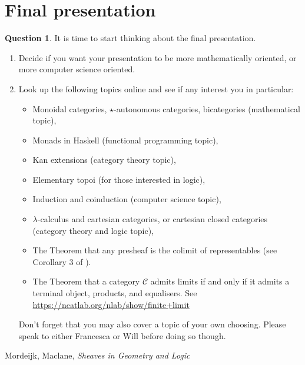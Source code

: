 \documentclass[12pt]{article}
\theoremstyle{plain}
\theoremstyle{definition}
\newtheorem{question}[thm]{Question}
\newcommand{\scr}[1]{\mathscr{#1}}
\begin{document}
	\section{Final presentation}
	\begin{question} It is time to start thinking about the final presentation.
		\begin{enumerate}
			\item Decide if you want your presentation to be more mathematically oriented, or more computer science oriented.
			\item Look up the following topics online and see if any interest you in particular:
			\begin{itemize}
				\item Monoidal categories, $\star$-autonomous categories, bicategories (mathematical topic),
				\item Monads in Haskell (functional programming topic),
				\item Kan extensions (category theory topic),
				\item Elementary topoi (for those interested in logic),
				\item Induction and coinduction (computer science topic),
				\item $\lambda$-calculus and cartesian categories, or cartesian closed categories (category theory and logic topic),
				\item The Theorem that any presheaf is the colimit of representables (see Corollary 3 of \cite[Page 42]{MM}).
				\item The Theorem that a category $\scr{C}$ admits limits if and only if it admits a terminal object, products, and equalisers. See \url{https://ncatlab.org/nlab/show/finite+limit}
				\end{itemize}
			Don't forget that you may also cover a topic of your own choosing. Please speak to either Francesca or Will before doing so though.
			\end{enumerate}
		\end{question}
	
	\begin{thebibliography}{9}
		 Mordeijk, Maclane, \emph{Sheaves in Geometry and Logic}
		\end{thebibliography}
	
	
	
	
	
	
	
	
	
	
	
	
	
	
	
	
	
	
	
	
	
	
	
	
\end{document}
